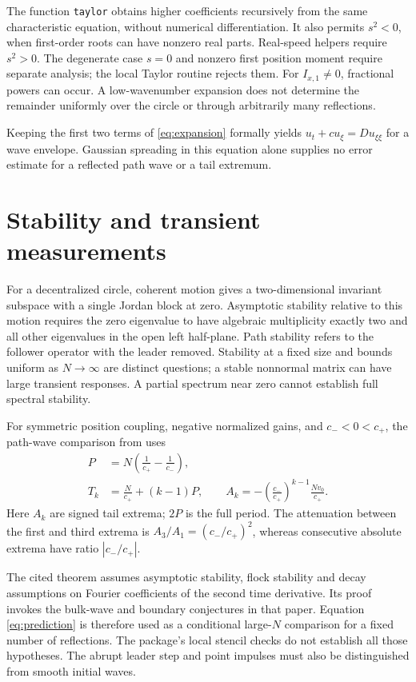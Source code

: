 \documentclass[11pt]{article}
\begin{document}
The function \texttt{taylor} obtains higher coefficients recursively from
the same characteristic equation, without numerical differentiation.
It also permits $s^2<0$, when first-order roots can have nonzero real
parts. Real-speed helpers require $s^2>0$.
The degenerate case $s=0$ and nonzero first position moment require
separate analysis; the local Taylor routine rejects them.
For $I_{x,1}\neq0$, fractional powers can occur.
A low-wavenumber expansion does not determine the remainder uniformly
over the circle or through arbitrarily many reflections.

Keeping the first two terms of \eqref{eq:expansion} formally yields
$u_t+cu_\xi=Du_{\xi\xi}$ for a wave envelope.
Gaussian spreading in this equation alone supplies no error estimate
for a reflected path wave or a tail extremum.

\section{Stability and transient measurements}

For a decentralized circle, coherent motion gives a two-dimensional invariant
subspace with a single Jordan block at zero. Asymptotic stability relative to
this motion requires the zero eigenvalue to have algebraic multiplicity
exactly two and all other eigenvalues in the open left half-plane.
Path stability refers to the follower operator with the leader removed.
Stability at a fixed size and bounds uniform as $N\to\infty$ are distinct
questions; a stable nonnormal matrix can have large transient responses.
A partial spectrum near zero cannot establish full spectral stability.

For symmetric position coupling, negative normalized gains, and
$c_-<0<c_+$, the path-wave comparison from
\cite[Theorem 3]{transients} uses
\begin{equation}\label{eq:prediction}
 \begin{split}
 P&=N\left(\frac1{c_+}-\frac1{c_-}\right),\\
 T_k&=\frac N{c_+}+(k-1)P,\qquad
 A_k=-\left(\frac{c_-}{c_+}\right)^{k-1}\frac{Nv_0}{c_+}.
 \end{split}
\end{equation}
Here $A_k$ are signed tail extrema; $2P$ is the full period.
The attenuation between the first and third extrema is
$A_3/A_1=(c_-/c_+)^2$, whereas consecutive absolute extrema have
ratio $|c_-/c_+|$.

The cited theorem assumes asymptotic stability, flock stability and
decay assumptions on Fourier coefficients of the second time derivative.
Its proof invokes the bulk-wave and boundary conjectures in that paper.
Equation \eqref{eq:prediction} is therefore used as a conditional
large-$N$ comparison for a fixed number of reflections.
The package's local stencil checks do not establish all those hypotheses.
The abrupt leader step and point impulses must also be distinguished from
smooth initial waves.
\end{document}

